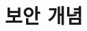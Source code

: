 \documentclass{article}
\theoremstyle{definition}
\begin{document}
\newpage
\section{보안 개념}



\end{document}
